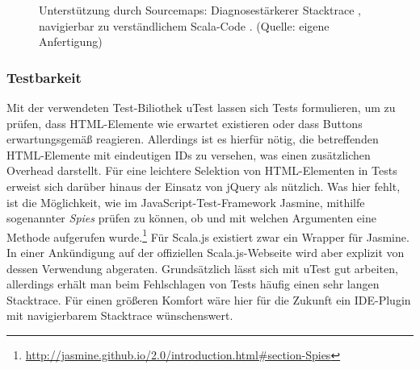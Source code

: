 \documentclass[a4paper, 12pt, hidelinks, listof=totoc, listoftables=totoc, bibliography=totoc]{scrreprt}
\begin{document}
\begin{figure}[!h]
	\centering
	\caption{Unterstützung durch Sourcemaps: Diagnosestärkerer Stacktrace \protect{}, navigierbar zu verständlichem Scala-Code \protect{}. (Quelle: eigene Anfertigung)}
	\label{fig:sourcemaps}
\end{figure}


\subsubsection{Testbarkeit}

Mit der verwendeten Test-Biliothek uTest lassen sich Tests formulieren, um zu prüfen, dass HTML-Elemente wie erwartet existieren oder dass Buttons erwartungsgemäß reagieren. Allerdings ist es hierfür nötig, die betreffenden HTML-Elemente mit eindeutigen IDs zu versehen, was einen zusätzlichen Overhead darstellt. Für eine leichtere Selektion von HTML-Elementen in Tests erweist sich darüber hinaus der Einsatz von jQuery als nützlich. Was hier fehlt, ist die Möglichkeit, wie im JavaScript-Test-Framework Jasmine, mithilfe sogenannter \textit{Spies} prüfen zu können, ob und mit welchen Argumenten eine Methode aufgerufen wurde.\footnote{\url{http://jasmine.github.io/2.0/introduction.html\#section-Spies}} Für Scala.js existiert zwar ein Wrapper für Jasmine. In einer Ankündigung auf der offiziellen Scala.js-Webseite\cite{scalajs.ASJ} wird aber explizit von dessen Verwendung abgeraten. Grundsätzlich lässt sich mit uTest gut arbeiten, allerdings erhält man beim Fehlschlagen von Tests häufig einen sehr langen Stacktrace. Für einen größeren Komfort wäre hier für die Zukunft ein IDE-Plugin mit navigierbarem Stacktrace wünschenswert.
\end{document}
